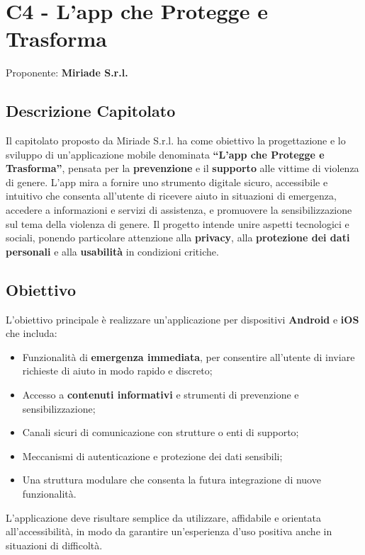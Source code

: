\documentclass[a4paper,12pt]{article}
\begin{document}
{{\newpage

\section{C4 - L'app che Protegge e Trasforma}
    Proponente: \textbf{Miriade S.r.l.}

    \subsection{Descrizione Capitolato}
        Il capitolato proposto da Miriade S.r.l. ha come obiettivo la progettazione e lo sviluppo di un’applicazione mobile denominata \textbf{“L’app che Protegge e Trasforma”}, pensata per la \textbf{prevenzione} e il \textbf{supporto} alle vittime di violenza di genere.
        L’app mira a fornire uno strumento digitale sicuro, accessibile e intuitivo che consenta all’utente di ricevere aiuto in situazioni di emergenza, accedere a informazioni e servizi di assistenza, e promuovere la sensibilizzazione sul tema della violenza di genere.
        Il progetto intende unire aspetti tecnologici e sociali, ponendo particolare attenzione alla \textbf{privacy}, alla \textbf{protezione dei dati personali} e alla \textbf{usabilità} in condizioni critiche.
    

    \subsection{Obiettivo}
        L’obiettivo principale è realizzare un’applicazione per dispositivi \textbf{Android} e \textbf{iOS} che includa:
        \begin{itemize}
            \item Funzionalità di \textbf{emergenza immediata}, per consentire all’utente di inviare richieste di aiuto in modo rapido e discreto;
            \item Accesso a \textbf{contenuti informativi} e strumenti di prevenzione e sensibilizzazione;
            \item Canali sicuri di comunicazione con strutture o enti di supporto;
            \item Meccanismi di autenticazione e protezione dei dati sensibili;
            \item Una struttura modulare che consenta la futura integrazione di nuove funzionalità.
        \end{itemize}
        L’applicazione deve risultare semplice da utilizzare, affidabile e orientata all’accessibilità, in modo da garantire un’esperienza d’uso positiva anche in situazioni di difficoltà.
    

}}
\end{document}
